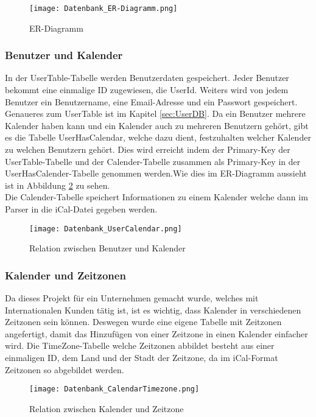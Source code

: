 \begin{figure}[H]
	\texttt{[image: Datenbank\_ER-Diagramm.png]}
    \caption{ER-Diagramm}
    \label{fig:erDiagramm}
\end{figure}

\subsubsection*{Benutzer und Kalender}
\label{ref:benutzerKalender}
In der UserTable-Tabelle werden Benutzerdaten gespeichert. Jeder Benutzer bekommt eine einmalige ID zugewiesen, die UserId. Weiters wird von jedem Benutzer ein Benutzername, eine Email-Adresse und ein Passwort gespeichert. Genaueres zum UserTable ist im Kapitel \ref{sec:UserDB}. Da ein Benutzer mehrere Kalender haben kann und ein Kalender auch zu mehreren Benutzern gehört, gibt es die Tabelle UserHasCalendar, welche dazu dient, festzuhalten welcher Kalender zu welchen Benutzern gehört. Dies wird erreicht indem der Primary-Key der UserTable-Tabelle und der Calender-Tabelle zusammen als Primary-Key in der UserHasCalender-Tabelle genommen werden.Wie dies im ER-Diagramm aussieht ist in Abbildung \ref{fig:userCalender} zu sehen.\\
Die Calender-Tabelle speichert Informationen zu einem Kalender welche dann im Parser in die iCal-Datei gegeben werden.
\begin{figure}[H]
	\texttt{[image: Datenbank\_UserCalendar.png]}
    \caption{Relation zwischen Benutzer und Kalender}
    \label{fig:userCalender}
\end{figure}

\subsubsection*{Kalender und Zeitzonen}
\label{ref:kalenderZeitzonen}
Da dieses Projekt für ein Unternehmen gemacht wurde, welches mit Internationalen Kunden tätig ist, ist es wichtig, dass Kalender in verschiedenen Zeitzonen sein können. Deswegen wurde eine eigene Tabelle mit Zeitzonen angefertigt, damit das Hinzufügen von einer Zeitzone in einen Kalender einfacher wird. Die TimeZone-Tabelle welche Zeitzonen abbildet besteht aus einer einmaligen ID, dem Land und der Stadt der Zeitzone, da im iCal-Format Zeitzonen so abgebildet werden. 
\begin{figure}[H]
	\texttt{[image: Datenbank\_CalendarTimezone.png]}
    \caption{Relation zwischen Kalender und Zeitzone}
    \label{fig:timezoneCalender}
\end{figure}

